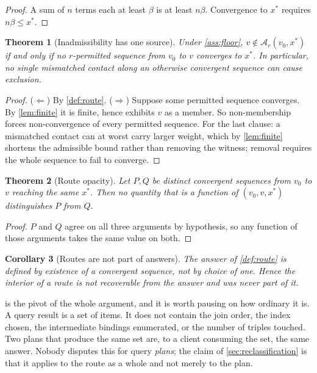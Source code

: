 \documentclass[11pt,a4paper]{article}
\theoremstyle{plain}
\newtheorem{theorem}{Theorem}[section]
\newtheorem{corollary}[theorem]{Corollary}
\theoremstyle{definition}
\theoremstyle{remark}
\newcommand{\Adm}{\mathcal{A}}
\begin{document}
\begin{proof}
A sum of $n$ terms each at least $\beta$ is at least $n\beta$. Convergence to
$x^\ast$ requires $n\beta \le x^\ast$.
\end{proof}

\begin{theorem}[Inadmissibility has one source]
\label{thm:onesource}
Under \cref{ass:floor}, $v \notin \Adm_r(v_0,x^\ast)$ if and only if no
$r$-permitted sequence from $v_0$ to $v$ converges to $x^\ast$. In particular,
no single mismatched contact along an otherwise convergent sequence can cause
exclusion.
\end{theorem}

\begin{proof}
($\Leftarrow$) By \cref{def:route}. ($\Rightarrow$) Suppose some permitted
sequence converges. By \cref{lem:finite} it is finite, hence exhibits $v$ as a
member. So non-membership forces non-convergence of every permitted sequence.
For the last clause: a mismatched contact can at worst carry larger weight,
which by \cref{lem:finite} shortens the admissible bound rather than removing
the witness; removal requires the whole sequence to fail to converge.
\end{proof}

\begin{theorem}[Route opacity]
\label{thm:opacity}
Let $P,Q$ be distinct convergent sequences from $v_0$ to $v$ reaching the same
$x^\ast$. Then no quantity that is a function of $(v_0,v,x^\ast)$ distinguishes
$P$ from $Q$.
\end{theorem}

\begin{proof}
$P$ and $Q$ agree on all three arguments by hypothesis, so any function of those
arguments takes the same value on both.
\end{proof}

\begin{corollary}[Routes are not part of answers]
\label{cor:notpart}
The answer of \cref{def:route} is defined by \emph{existence} of a convergent
sequence, not by choice of one. Hence the interior of a route is not recoverable
from the answer and was never part of it.
\end{corollary}

 is the pivot of the whole argument, and it is worth pausing
on how ordinary it is. A query result is a set of items. It does not contain the
join order, the index chosen, the intermediate bindings enumerated, or the
number of triples touched. Two plans that produce the same set are, to a client
consuming the set, the same answer. Nobody disputes this for query
\emph{plans}; the claim of \cref{sec:reclassification} is that it applies to the
route as a whole and not merely to the plan.
\end{document}
